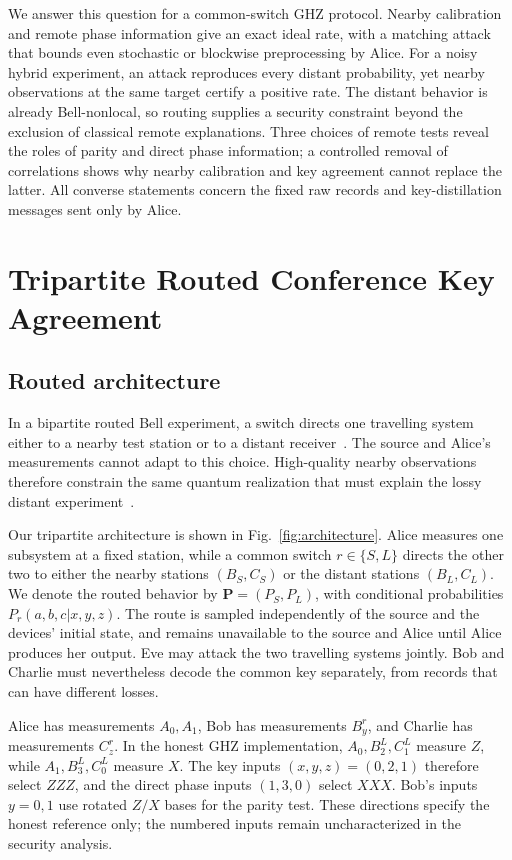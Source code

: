 \documentclass[aps,10pt,onecolumn,prx,superscriptaddress,longbibliography,nofootinbib]{revtex4-2}
\begin{document}
We answer this question for a common-switch GHZ protocol. Nearby calibration and remote phase information give an exact ideal rate, with a matching attack that bounds even stochastic or blockwise preprocessing by Alice. For a noisy hybrid experiment, an attack reproduces every distant probability, yet nearby observations at the same target certify a positive rate. The distant behavior is already Bell-nonlocal, so routing supplies a security constraint beyond the exclusion of classical remote explanations. Three choices of remote tests reveal the roles of parity and direct phase information; a controlled removal of correlations shows why nearby calibration and key agreement cannot replace the latter. All converse statements concern the fixed raw records and key-distillation messages sent only by Alice.

\section{Tripartite Routed Conference Key Agreement}\label{sec:framework}

\subsection{Routed architecture}

In a bipartite routed Bell experiment, a switch directs one travelling system either to a nearby test station or to a distant receiver~\cite{Chaturvedi2024,Lobo2024}. The source and Alice's measurements cannot adapt to this choice. High-quality nearby observations therefore constrain the same quantum realization that must explain the lossy distant experiment~\cite{TanWolf2024,LeRoy2025}.

Our tripartite architecture is shown in Fig.~\ref{fig:architecture}. Alice measures one subsystem at a fixed station, while a common switch \(r\in\{S,L\}\) directs the other two to either the nearby stations \((B_S,C_S)\) or the distant stations \((B_L,C_L)\). We denote the routed behavior by \(\mathbf P=(P_S,P_L)\), with conditional probabilities \(P_r(a,b,c|x,y,z)\). The route is sampled independently of the source and the devices' initial state, and remains unavailable to the source and Alice until Alice produces her output. Eve may attack the two travelling systems jointly. Bob and Charlie must nevertheless decode the common key separately, from records that can have different losses.

Alice has measurements \(A_0,A_1\), Bob has measurements \(B_y^r\), and Charlie has measurements \(C_z^r\). In the honest GHZ implementation, \(A_0,B_2^L,C_1^L\) measure \(Z\), while \(A_1,B_3^L,C_0^L\) measure \(X\). The key inputs \((x,y,z)=(0,2,1)\) therefore select \(ZZZ\), and the direct phase inputs \((1,3,0)\) select \(XXX\). Bob's inputs \(y=0,1\) use rotated \(Z/X\) bases for the parity test. These directions specify the honest reference only; the numbered inputs remain uncharacterized in the security analysis.
\end{document}
